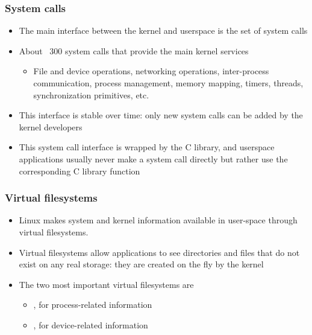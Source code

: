 \begin{frame}
  \frametitle{System calls}
  \begin{itemize}
  \item The main interface between the kernel and userspace is the set
    of system calls
  \item About ~300 system calls that provide the main kernel services
    \begin{itemize}
    \item File and device operations, networking operations,
      inter-process communication, process management, memory mapping,
      timers, threads, synchronization primitives, etc.
    \end{itemize}
  \item This interface is stable over time: only new system calls can
    be added by the kernel developers
  \item This system call interface is wrapped by the C library, and
    userspace applications usually never make a system call directly
    but rather use the corresponding C library function
  \end{itemize}
\end{frame}

\begin{frame}
  \frametitle{Virtual filesystems}
  \begin{itemize}
  \item Linux makes system and kernel information available in
    user-space through virtual filesystems.
  \item Virtual filesystems allow applications to see directories and
    files that do not exist on any real storage: they are created on the
    fly by the kernel
  \item The two most important virtual filesystems are
    \begin{itemize}
    \item {}, for process-related information
    \item {}, for device-related information
    \end{itemize}
  \end{itemize}
\end{frame}
